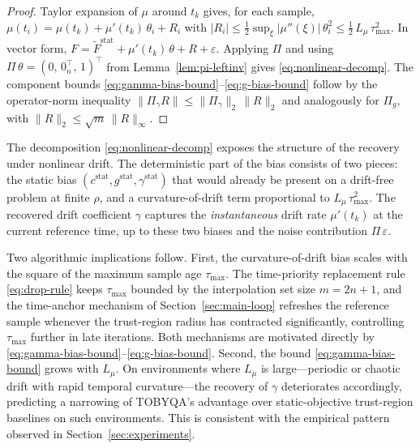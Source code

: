 \documentclass[11pt,a4paper]{article}
\begin{document}
\begin{proof}
Taylor expansion of $\mu$ around $t_k$ gives, for each sample,
$\mu(t_i) = \mu(t_k) + \mu'(t_k)\,\theta_i + R_i$ with
$|R_i| \le \tfrac{1}{2}\sup_{\xi}|\mu''(\xi)|\,\theta_i^2
\le \tfrac{1}{2}\,L_\mu\,\tau_{\max}^2$. In vector form,
$F = \tilde F^{\mathrm{stat}} + \mu'(t_k)\,\theta + R + \varepsilon$.
Applying $\Pi$ and using $\Pi\,\theta = (0,\,0_n^\top,\,1)^\top$
from Lemma~\ref{lem:pi-leftinv} gives
\eqref{eq:nonlinear-decomp}. The component bounds
\eqref{eq:gamma-bias-bound}--\eqref{eq:g-bias-bound} follow by
the operator-norm inequality
$\|\Pi_\gamma R\| \le \|\Pi_\gamma\|_2\,\|R\|_2$ and analogously
for $\Pi_g$, with $\|R\|_2 \le \sqrt{m}\,\|R\|_\infty$.
\end{proof}

The decomposition \eqref{eq:nonlinear-decomp} exposes the
structure of the recovery under nonlinear drift. The deterministic
part of the bias consists of two pieces: the static bias
$(c^{\mathrm{stat}}, g^{\mathrm{stat}}, \gamma^{\mathrm{stat}})$
that would already be present on a drift-free problem at finite
$\rho$, and a curvature-of-drift term proportional to
$L_\mu\,\tau_{\max}^2$. The recovered drift coefficient $\gamma$
captures the \emph{instantaneous} drift rate $\mu'(t_k)$ at the
current reference time, up to these two biases and the noise
contribution $\Pi\,\varepsilon$.

Two algorithmic implications follow. First, the
curvature-of-drift bias scales with the square of the maximum
sample age $\tau_{\max}$. The time-priority replacement rule
\eqref{eq:drop-rule} keeps $\tau_{\max}$ bounded by the
interpolation set size $m = 2n + 1$, and the time-anchor
mechanism of Section~\ref{sec:main-loop} refreshes the reference
sample whenever the trust-region radius has contracted
significantly, controlling $\tau_{\max}$ further in late
iterations. Both mechanisms are motivated directly by
\eqref{eq:gamma-bias-bound}--\eqref{eq:g-bias-bound}. Second, the
bound \eqref{eq:gamma-bias-bound} grows with $L_\mu$. On
environments where $L_\mu$ is large—periodic or chaotic drift
with rapid temporal curvature—the recovery of $\gamma$
deteriorates accordingly, predicting a narrowing of TOBYQA's
advantage over static-objective trust-region baselines on such
environments. This is consistent with the empirical pattern
observed in Section~\ref{sec:experiments}.
\end{document}
